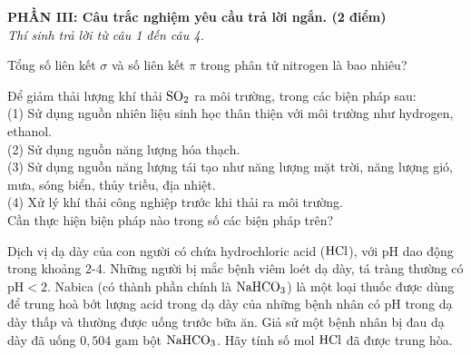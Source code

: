 \documentclass[12pt,a4paper]{article}
\begin{document}
\bigskip
\noindent
\textbf{PHẦN III: Câu trắc nghiệm yêu cầu trả lời ngắn. (2 điểm)}\\
\textit{Thí sinh trả lời từ câu 1 đến câu 4.}

\begin{ex}
Tổng số liên kết $\sigma$ và số liên kết $\pi$ trong phân tử nitrogen là bao nhiêu?
\end{ex}

\begin{ex}
Để giảm thải lượng khí thải $\ce{SO2}$ ra môi trường, trong các biện pháp sau:\\
(1) Sử dụng nguồn nhiên liệu sinh học thân thiện với môi trường như hydrogen, ethanol.\\
(2) Sử dụng nguồn năng lượng hóa thạch.\\
(3) Sử dụng nguồn năng lượng tái tạo như năng lượng mặt trời, năng lượng gió, mưa, sóng biển, thủy triều, địa nhiệt.\\
(4) Xử lý khí thải công nghiệp trước khi thải ra môi trường.\\
Cần thực hiện biện pháp nào trong số các biện pháp trên?
\end{ex}

\begin{ex}
Dịch vị dạ dày của con người có chứa hydrochloric acid ($\ce{HCl}$), với pH dao động trong khoảng 2-4. Những người bị mắc bệnh viêm loét dạ dày, tá tràng thường có $\text{pH} < 2$. Nabica (có thành phần chính là $\ce{NaHCO3}$) là một loại thuốc được dùng để trung hoà bớt lượng acid trong dạ dày của những bệnh nhân có pH trong dạ dày thấp và thường được uống trước bữa ăn. Giả sử một bệnh nhân bị đau dạ dày đã uống $0{,}504\text{ gam}$ bột $\ce{NaHCO3}$. Hãy tính số mol $\ce{HCl}$ đã được trung hòa.
\end{ex}
\end{document}
